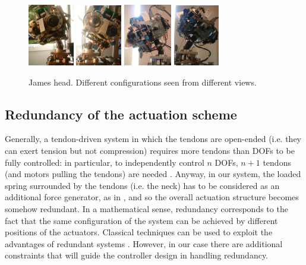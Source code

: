 \documentclass[conference]{IEEEtran}
\numberwithin{equation}{section}
\begin{document}
\begin{figure}[tbp]
\centering
\includegraphics[width=20mm]{image/HeadRight.jpg} \hspace{1pt}
\includegraphics[width=20mm]{image/HeadLeft.jpg} \hspace{1pt}
\includegraphics[width=21mm]{image/HeadAhead.jpg} \hspace{1pt}
\includegraphics[width=20mm]{image/HeadBack.jpg} \hspace{1pt}\\

\caption{James head. Different configurations seen from different views.}
\label{Fig:HeadPos}
\end{figure}


\subsection{Redundancy of the actuation scheme}

Generally, a tendon-driven system in which the tendons are open-ended (i.e. they can exert tension but not compression) requires more tendons than DOFs to be fully controlled: in particular, to independently control $n$ DOFs, $n+1$ tendons (and motors pulling the tendons) are needed \cite{Tsai}. Anyway, in our system, the loaded spring surrounded by the tendons (i.e. the neck) has to be considered as an additional force generator, as in \cite{Rovetta77}, and so the overall actuation structure becomes somehow redundant. In a mathematical sense, redundancy corresponds to the fact that the same configuration of the system can be achieved by different positions of the actuators. Classical techniques can be used to exploit the advantages of redundant systems \cite{SamsonEspiau}. However, in our case there are additional constraints that will guide the controller design in handling redundancy. 
\end{document}
